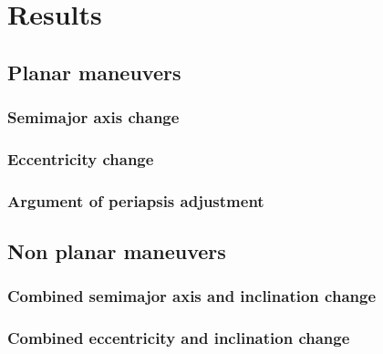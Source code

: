 \chapter{Results} \label{sec:results}

\section{Planar maneuvers} \label{sec:resplanar}

\subsection{Semimajor axis change} \label{sec:ressma}

\subsection{Eccentricity change} \label{sec:resecc}

\subsection{Argument of periapsis adjustment}

\section{Non planar maneuvers} \label{sec:resnonplanar}

\subsection{Combined semimajor axis and inclination change} \label{sec:resedelbaum}

\subsection{Combined eccentricity and inclination change}
